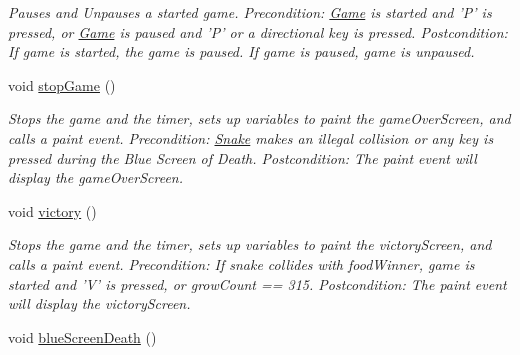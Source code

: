 \begin{DoxyCompactItemize}
\begin{DoxyCompactList}\small\item\em \-Pauses and \-Unpauses a started game. \-Precondition\-: \hyperlink{classGame}{\-Game} is started and '\-P' is pressed, or \hyperlink{classGame}{\-Game} is paused and '\-P' or a directional key is pressed. \-Postcondition\-: \-If game is started, the game is paused. \-If game is paused, game is unpaused. \end{DoxyCompactList}\item 
\hypertarget{classGame_a9ec1a0c5ee8b5e06fa429162b5e73564}{void \hyperlink{classGame_a9ec1a0c5ee8b5e06fa429162b5e73564}{stop\-Game} ()}\label{classGame_a9ec1a0c5ee8b5e06fa429162b5e73564}

\begin{DoxyCompactList}\small\item\em \-Stops the game and the timer, sets up variables to paint the game\-Over\-Screen, and calls a paint event. \-Precondition\-: \hyperlink{classSnake}{\-Snake} makes an illegal collision or any key is pressed during the \-Blue \-Screen of \-Death. \-Postcondition\-: \-The paint event will display the game\-Over\-Screen. \end{DoxyCompactList}\item 
\hypertarget{classGame_a6a02e00bf61930576156c6c59b817a25}{void \hyperlink{classGame_a6a02e00bf61930576156c6c59b817a25}{victory} ()}\label{classGame_a6a02e00bf61930576156c6c59b817a25}

\begin{DoxyCompactList}\small\item\em \-Stops the game and the timer, sets up variables to paint the victory\-Screen, and calls a paint event. \-Precondition\-: \-If snake collides with food\-Winner, game is started and '\-V' is pressed, or grow\-Count == 315. \-Postcondition\-: \-The paint event will display the victory\-Screen. \end{DoxyCompactList}\item 
\hypertarget{classGame_a21cdf5a4c8decb922bbb17ae6e55f636}{void \hyperlink{classGame_a21cdf5a4c8decb922bbb17ae6e55f636}{blue\-Screen\-Death} ()}\label{classGame_a21cdf5a4c8decb922bbb17ae6e55f636}


\end{DoxyCompactItemize}
